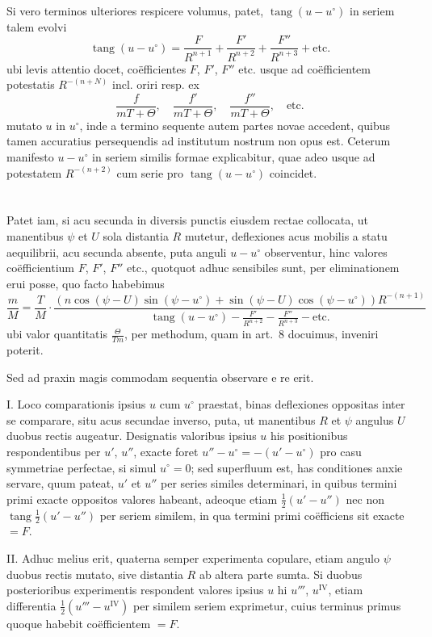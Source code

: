 \documentclass[fontsize=11pt,paper=a4,twoside,openany]{scrbook}
\DeclareMathOperator{\tang}{tang}
\begin{document}
Si vero terminos ulteriores respicere volumus, patet, $\tang(u-u^{\circ})$ in seriem talem evolvi
\[
\tang(u-u^{\circ}) = \frac{F}{R^{n+1}} + \frac{F'}{R^{n+2}} + \frac{F''}{R^{n+3}} + \text{etc.}
\]
ubi levis attentio docet, coëfficientes $F$, $F'$, $F''$ etc. usque ad coëfficientem potestatis $R^{-(n+N)}$ incl. oriri resp. ex
\[
\frac{f}{mT+\Theta},\quad \frac{f'}{mT+\Theta},\quad \frac{f''}{mT+\Theta},\quad \text{etc.}
\]
mutato $u$ in $u^{\circ}$, inde a termino sequente autem partes novae accedent, quibus tamen accuratius persequendis ad institutum nostrum non opus est. Ceterum manifesto $u-u^{\circ}$ in seriem similis formae explicabitur, quae adeo usque ad potestatem $R^{-(n+2)}$ cum serie pro $\tang(u-u^{\circ})$ coincidet.

\section{}

Patet iam, si acu secunda in diversis punctis eiusdem rectae collocata, ut manentibus $\psi$ et $U$ sola distantia $R$ mutetur, deflexiones acus mobilis a statu aequilibrii, acu secunda absente, puta anguli $u-u^{\circ}$ observentur, hinc valores coëfficientium $F$, $F'$, $F''$ etc., quotquot adhuc sensibiles sunt, per eliminationem erui posse, quo facto habebimus
\[
\frac{m}{M} = \frac{T}{M}\cdot\frac{(n\cos(\psi-U)\sin(\psi-u^{\circ}) + \sin(\psi-U)\cos(\psi-u^{\circ}))R^{-(n+1)}}{\tang(u-u^{\circ}) - \frac{F'}{R^{n+2}} - \frac{F''}{R^{n+3}} - \text{etc.}}
\]
ubi valor quantitatis $\frac{\Theta}{Tm}$, per methodum, quam in art.~8 docuimus, inveniri poterit.

Sed ad praxin magis commodam sequentia observare e re erit.

I. Loco comparationis ipsius $u$ cum $u^{\circ}$ praestat, binas deflexiones oppositas inter se comparare, situ acus secundae inverso, puta, ut manentibus $R$ et $\psi$ angulus $U$ duobus rectis augeatur. Designatis valoribus ipsius $u$ his positionibus respondentibus per $u'$, $u''$, exacte foret $u''-u^{\circ}=-(u'-u^{\circ})$ pro casu symmetriae perfectae, si simul $u^{\circ}=0$; sed superfluum est, has conditiones anxie servare, quum pateat, $u'$ et $u''$ per series similes determinari, in quibus termini primi exacte oppositos valores habeant, adeoque etiam $\frac{1}{2}(u'-u'')$ nec non $\tang\frac{1}{2}(u'-u'')$ per seriem similem, in qua termini primi coëfficiens sit exacte $=F$.

II. Adhuc melius erit, quaterna semper experimenta copulare, etiam angulo $\psi$ duobus rectis mutato, sive distantia $R$ ab altera parte sumta. Si duobus posterioribus experimentis respondent valores ipsius $u$ hi $u'''$, $u^{\mathrm{IV}}$, etiam differentia $\frac{1}{2}(u'''-u^{\mathrm{IV}})$ per similem seriem exprimetur, cuius terminus primus quoque habebit coëfficientem $=F$.
\end{document}
